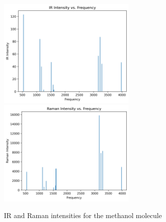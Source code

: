 \documentclass[12pt]{article}
\begin{document}
\begin{figure}[h] 
    \centering
    \includegraphics[width=0.6\textwidth]{IR_Intensities.png}
    \includegraphics[width=0.6\textwidth]{Raman_Intensities.png}
    \caption{IR and Raman intensities for the methanol molecule}
    \label{fig:ir_intensity}
\end{figure}



\end{document}
